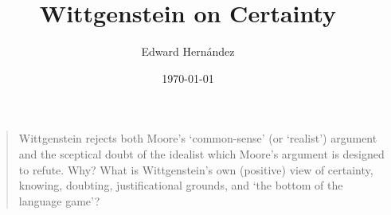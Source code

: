 \documentclass[doc,12pt,apacite,biblatex]{apa6}
\begin{document}
\title{Wittgenstein on Certainty}
\author{Edward Hern\'{a}ndez}
\date{\today}

\maketitle

\vspace{-20pt}
\begin{quote}
	Wittgenstein rejects both Moore's `common-sense' (or `realist') argument
	and the sceptical doubt of the idealist which Moore's argument is designed
	to refute.  Why?  What is Wittgenstein's own (positive) view of certainty,
	knowing, doubting, justificational grounds, and `the bottom of the language
	game'?
\end{quote}
\clearpage
\end{document}
